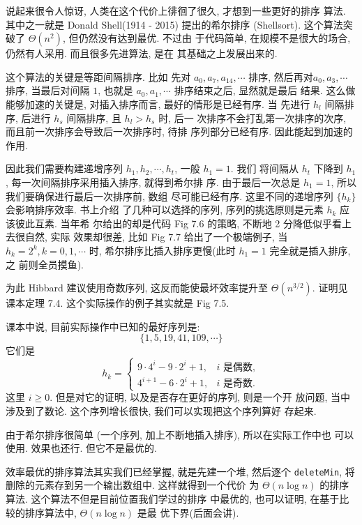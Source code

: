 \documentclass[a4paper]{ctexart}
\theoremstyle{definition}
\theoremstyle{definition}
\begin{document}
说起来很令人惊讶, 人类在这个代价上徘徊了很久, 才想到一些更好的排序
算法. 其中之一就是 Donald Shell(1914 - 2015) 提出的希尔排序
(Shellsort). 这个算法突破了 $\Theta(n^2)$, 但仍然没有达到最优. 不过由
于代码简单, 在规模不是很大的场合, 仍然有人采用. 而且很多先进算法, 是在
其基础之上发展出来的.

 这个算法的关键是等距间隔排序. 比如
先对 $a_0, a_7, a_{14}, \cdots$ 排序, 然后再对$a_0, a_3, \cdots$ 排序,
当最后对间隔 $1$, 也就是 $a_0, a_1, \cdots$ 排序结束之后, 显然就是最后
结果. 这么做能够加速的关键是, 对插入排序而言, 最好的情形是已经有序. 当
先进行 $h_l$ 间隔排序, 后进行 $h_s$ 间隔排序, 且 $h_l > h_s$ 时, 后一
次排序不会打乱第一次排序的次序, 而且前一次排序会导致后一次排序时, 待排
序列部分已经有序. 因此能起到加速的作用.

因此我们需要构建递增序列 $h_1, h_2, \cdots, h_t$, 一般 $h_1 = 1$. 我们
将间隔从 $h_t$ 下降到 $h_1$, 每一次间隔排序采用插入排序, 就得到希尔排
序. 由于最后一次总是 $h_1 = 1$, 所以我们要确保进行最后一次排序前, 数组
尽可能已经有序. 这里不同的递增序列 $\{h_k\}$ 会影响排序效率. 书上介绍
了几种可以选择的序列, 序列的挑选原则是元素 $h_k$ 应该彼此互素. 当年希
尔给出的却是代码 Fig 7.6 的策略, 不断地 2 分降低似乎看上去很自然, 实际
效果却很差, 比如 Fig 7.7 给出了一个极端例子, 当 $h_k = 2^k, k = 0, 1,
\cdots$ 时, 希尔排序比插入排序更慢(此时 $h_1 = 1$ 完全就是插入排序, 之
前则全员摸鱼).

为此 Hibbard 建议使用奇数序列, 这反而能使最坏效率提升至 $\Theta(n^{3 /
  2})$. 证明见课本定理 7.4. 这个实际操作的例子其实就是 Fig 7.5.

课本中说, 目前实际操作中已知的最好序列是:
$$
\{1, 5, 19, 41, 109, \cdots\}
$$
它们是
$$
h_k = \left\{
\begin{array}{ll}
  9 \cdot 4^i - 9 \cdot 2^i + 1, & \mbox{$i$ 是偶数},\\
  4^{i + 1} - 6 \cdot 2^i + 1, & \mbox{$i$ 是奇数}.
\end{array}
\right.
$$
这里 $i \geq 0$. 但是对它的证明, 以及是否存在更好的序列, 则是一个开
放问题, 当中涉及到了数论. 这个序列增长很快, 我们可以实现把这个序列算好
存起来.

由于希尔排序很简单 (一个序列, 加上不断地插入排序), 所以在实际工作中也
可以使用. 效果也还行. 但它不是最优的.


效率最优的排序算法其实我们已经掌握, 就是先建一个堆, 然后逐个
\verb|deleteMin|, 将删除的元素存到另一个输出数组中. 这样就得到一个代价
为 $\Theta(n \log n)$ 的排序算法. 这个算法不但是目前位置我们学过的排序
中最优的, 也可以证明, 在基于比较的排序算法中, $\Theta(n \log n)$ 是最
优下界(后面会讲).
\end{document}
